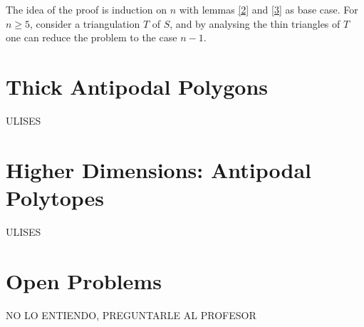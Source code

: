 \documentclass[twoside]{article}
\begin{document}
The idea of the proof is induction on $n$ with lemmas \ref{2} and \ref{3} as base case. For $n\geq 5$, consider a triangulation $T$ of $S$, and by analysing the thin triangles of $T$ one can reduce the problem to the case $n-1$. 


\section{Thick Antipodal Polygons}
ULISES

\section{Higher Dimensions: Antipodal Polytopes}
ULISES


 \section{Open Problems}
 NO LO ENTIENDO, PREGUNTARLE AL PROFESOR
\end{document}
